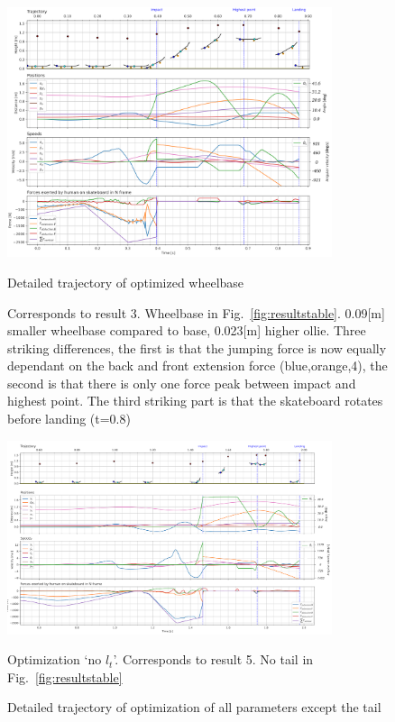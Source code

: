 \documentclass[default,iicol]{sn-jnl}
\begin{document}
\begin{figure}
    \centering
    \includegraphics[trim={0cm 0cm 0cm 0cm},clip,width=0.85\textwidth]{paper/figure/Results/data_l_wbdpi600 (1).png}    
    \caption[Trajectory, positions, speeds, and forces for wheelbase optimization]{Detailed trajectory of optimized wheelbase}\label{f_wheelbase}
    Corresponds to result 3. Wheelbase in Fig.~\ref{fig:resultstable}. 0.09[m] smaller wheelbase compared to base, 0.023[m] higher ollie. Three striking differences, the first is that the jumping force is now equally dependant on the back and front extension force (blue,orange,4), the second is that there is only one force peak between impact and highest point. The third striking part is that the skateboard rotates before landing (t=0.8)

    \includegraphics[trim={0cm 0cm 0cm 0cm},clip,width=0.85\textwidth]{paper/figure/Results/data_no_taildpi600 (1).png}
    \caption[Trajectory, positions, speeds, and forces for `all except tail length' optimization]{Detailed trajectory of optimization of all parameters except the tail}\label{f_notail}
    Optimization `no $l_t$'. Corresponds to result 5. No tail in Fig.~\ref{fig:resultstable}
    
\end{figure}
\end{document}
